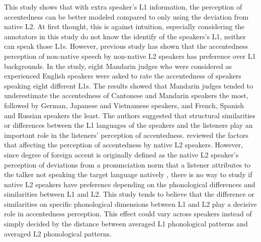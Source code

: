 This study shows that with extra speaker's L1 information, the perception of accentedness can be better modeled compared to only using the deviation from native L2. At first thought, this is against intuition, especially considering the annotators in this study do not know the identify of the speakers's L1, neither can speak those L1s. However, previous study \citep{yuan2010perception} has shown that the accentedness perception of non-native speech by non-native L2 speakers has preference over L1 backgrounds. In the study, eight Mandarin judges who were considered as experienced English speakers were asked to rate the accentedness of speakers speaking eight different L1s. The results showed that Mandarin judges tended to underestimate the accentedness of Cantonese and Mandarin speakers the most, followed by German, Japanese and Vietnamese speakers, and French, Spanish and Russian speakers the least. The authors suggested that structural similarities or differences between the L1 languages of the speakers and the listeners play an important role in the listeners' perception of accentedness. \cite{flege1995factors} reviewed the factors that affecting the perception of accentedness by native L2 speakers. However, since degree of foreign accent is originally defined as the native L2 speaker's perception of deviations from a pronunciation norm that a listener attributes to the
talker not speaking the target language natively \citep{mccullough2013acoustic}, there is no way to study if native L2 speakers have preference depending on the phonological differences and similarities between L1 and L2. This study tends to believe that the difference or similarities on specific phonological dimensions between L1 and L2 play a decisive role in accentedness perception. This effect could vary across speakers instead of simply decided by the distance between averaged L1 phonological patterns and averaged L2 phonological patterns.

